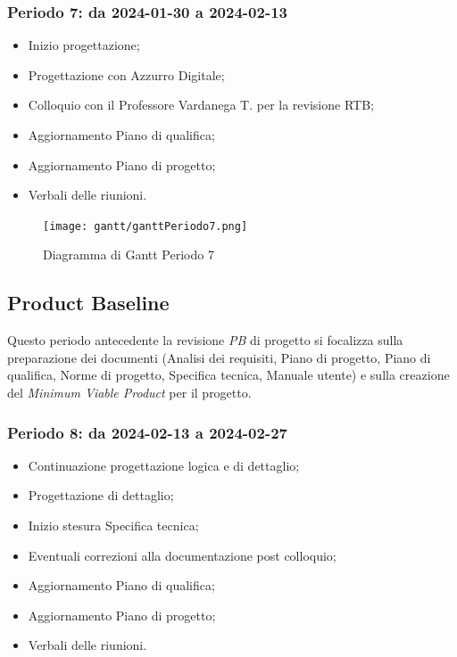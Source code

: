 \documentclass[10pt, a4paper]{article}
\begin{document}
\subsubsection{Periodo 7: da 2024-01-30 a 2024-02-13}
%
\begin{itemize}
    \item Inizio progettazione;
    \item Progettazione con Azzurro Digitale;
    \item Colloquio con il Professore Vardanega T. per la revisione RTB;
    \item Aggiornamento Piano di qualifica;
    \item Aggiornamento Piano di progetto;
    \item Verbali delle riunioni.
\end{itemize}
\begin{figure}[H]
    \centering        
    \texttt{[image: gantt/ganttPeriodo7.png]}
    \caption{Diagramma di Gantt Periodo 7}
\end{figure}

\subsection{Product Baseline}
Questo periodo antecedente la revisione \textit{PB\pg} di progetto si focalizza sulla preparazione dei documenti (Analisi dei requisiti, Piano di progetto, Piano di qualifica, Norme di progetto, Specifica tecnica, Manuale utente) e sulla creazione del \textit{Minimum Viable Product\pg} per il progetto.

\subsubsection{Periodo 8: da 2024-02-13 a 2024-02-27}
%
\begin{itemize}
    \item Continuazione progettazione logica e di dettaglio;
    \item Progettazione di dettaglio;
    \item Inizio stesura Specifica tecnica;
    \item Eventuali correzioni alla documentazione post colloquio;
    \item Aggiornamento Piano di qualifica;
    \item Aggiornamento Piano di progetto;
    \item Verbali delle riunioni.
\end{itemize}
\end{document}
